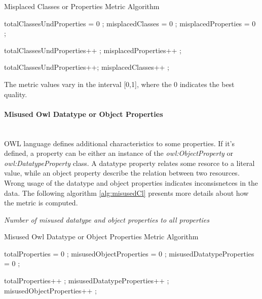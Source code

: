 \begin{algorithm}
\caption{Misplaced Classes or Properties Metric Algorithm}\label{alg:misplacedCl}
\begin{algorithmic}[1]
\State totalClassesUndProperties = 0 ;
\State misplacedClasses = 0 ;
\State misplacedProperties = 0 ;
\EndProcedure

 totalClassesUndProperties++ ;\EndIf 
{} misplacedProperties++ ; \EndIf 

 totalClassesUndProperties++; \EndIf  
{} misplacedClasses++ ; \EndIf 
{}
\EndProcedure
\end{algorithmic}
\end{algorithm}

The metric values vary in the interval [0,1], where  the 0 indicates the best quality.


\paragraph{Misused Owl Datatype or Object Properties} ~\\

OWL language defines additional characteristics to some properties. 
If it's defined, a property can be either an instance of the \textit{owl:ObjectProperty} or \textit{owl:DatatypeProperty} class.
A datatype property relates some resorce to a literal value, while an object property describe the relation between two resources.
Wrong usage of the datatype and object properties indicates inconsisnetces in the data.
The following algorithm  \ref{alg:misusedCl} presents more details about how the metric is computed.

\begin{mdframed}[style=metricdefinition]
\emph{Number of misused datatype and object properties to all properties}
\end{mdframed}


\begin{algorithm}
\caption{Misused Owl Datatype or Object Properties Metric Algorithm} \label{alg:misusedCl}
\begin{algorithmic}[1]
\State totalProperties = 0 ;
\State misusedObjectProperties = 0 ;
\State misusedDatatypeProperties = 0 ;
\EndProcedure

 totalProperties++ ;\EndIf 
{} misusedDatatypeProperties++ ; \EndIf 
{} misusedObjectProperties++ ; \EndIf 
{}
\EndProcedure
\end{algorithmic}
\end{algorithm}

